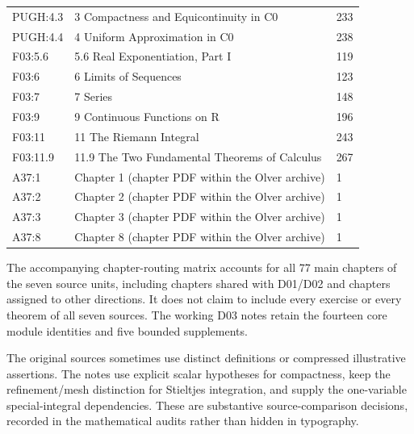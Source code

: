 \documentclass[11pt,oneside,a4paper]{book}
\theoremstyle{definition}
\theoremstyle{remark}
\begin{document}
\begin{longtable}{p{22mm}p{99mm}p{20mm}}
PUGH:4.3 & 3 Compactness and Equicontinuity in C0 & 233 \\

PUGH:4.4 & 4 Uniform Approximation in C0 & 238 \\

F03:5.6 & 5.6 Real Exponentiation, Part I & 119 \\

F03:6 & 6 Limits of Sequences & 123 \\

F03:7 & 7 Series & 148 \\

F03:9 & 9 Continuous Functions on R & 196 \\

F03:11 & 11 The Riemann Integral & 243 \\

F03:11.9 & 11.9 The Two Fundamental Theorems of Calculus & 267 \\

A37:1 & Chapter 1 (chapter PDF within the Olver archive) & 1 \\

A37:2 & Chapter 2 (chapter PDF within the Olver archive) & 1 \\

A37:3 & Chapter 3 (chapter PDF within the Olver archive) & 1 \\

A37:8 & Chapter 8 (chapter PDF within the Olver archive) & 1 \\

\bottomrule\end{longtable}\normalsize

The accompanying chapter-routing matrix accounts for all 77 main chapters of the seven source units, including chapters shared with D01/D02 and chapters assigned to other directions. It does not claim to include every exercise or every theorem of all seven sources. The working D03 notes retain the fourteen core module identities and five bounded supplements.

The original sources sometimes use distinct definitions or compressed illustrative assertions. The notes use explicit scalar hypotheses for compactness, keep the refinement/mesh distinction for Stieltjes integration, and supply the one-variable special-integral dependencies. These are substantive source-comparison decisions, recorded in the mathematical audits rather than hidden in typography.

\end{document}

